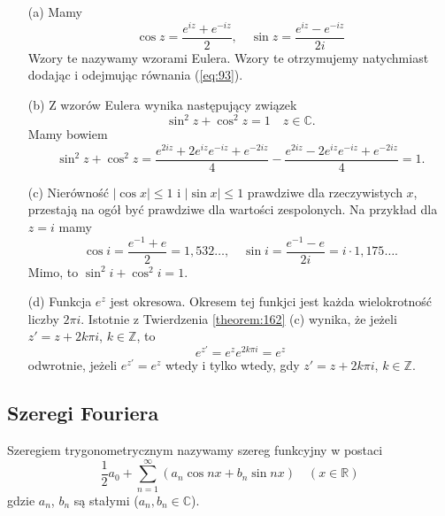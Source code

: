 \documentclass[leqno]{article}
\begin{document}
\begin{justify}
\begin{wniosek}
{
    \begin{itemize}
        \item [(a)]
            Mamy 
            \[
                \cos z = \frac{e^{iz} + e^{-iz}}{2}, \quad \sin z = \frac{e^{iz} - e^{-iz}}{2i}
            \]
            Wzory te nazywamy wzorami Eulera. Wzory te otrzymujemy natychmiast dodając i odejmując równania (\ref{eq:93}).
        \item [(b)]
            Z wzorów Eulera wynika następujący związek 
            \[
                \sin^2 z + \cos^2 z = 1 \quad z \in \mathbb{C}.
            \]
            Mamy bowiem
            \[
                \sin^2 z + \cos^2 z = \frac{e^{2iz} + 2e^{iz}e^{-iz} + e^{-2iz}}{4} - \frac{e^{2iz} - 2e^{iz}e^{-iz} + e^{-2iz}}{4} = 1.
            \]
        \item [(c)]
            Nierówność $|\cos x| \leqslant 1$ i $|\sin x| \leqslant 1$ prawdziwe dla rzeczywistych $x$, 
            przestają na ogół być prawdziwe dla wartości zespolonych. Na przykład dla $z = i$ mamy
            \[
                \cos i = \frac{e^{-1} + e}{2} = 1,532\ldots, \quad \sin i = \frac{e^{-1} - e}{2i} = i \cdot 1,175\ldots.
            \]
            Mimo, to $\sin^2 i + \cos^2 i = 1$.
        \item [(d)]
            Funkcja $e^z$ jest okresowa. Okresem tej funkjci jest każda wielokrotność liczby $2\pi i$. 
            Istotnie z Twierdzenia \ref{theorem:162} (c) wynika, że jeżeli $z' = z + 2k\pi i$, $k \in \mathbb{Z}$, to
            \[
                e^{z'} = e^z e^{2k\pi i} = e^z
            \]
            odwrotnie, jeżeli $e^{z'} = e^z$ wtedy i tylko wtedy, gdy $z' = z + 2k\pi i$, $k \in \mathbb{Z}$.
    \end{itemize}
}
\end{wniosek}

\newpage
\subsection{Szeregi Fouriera}
\begin{defn}
    Szeregiem trygonometrycznym nazywamy szereg funkcyjny w postaci
    \begin{equation}\label{eq:94}
        \frac{1}{2}a_0 + \sum_{n=1}^{\infty}(a_n \cos nx + b_n \sin nx) \quad (x \in \mathbb{R})
    \end{equation}
    gdzie $a_n$, $b_n$ są stałymi ($a_n, b_n \in \mathbb{C}$).
\end{defn}


\end{justify}
\end{document}
